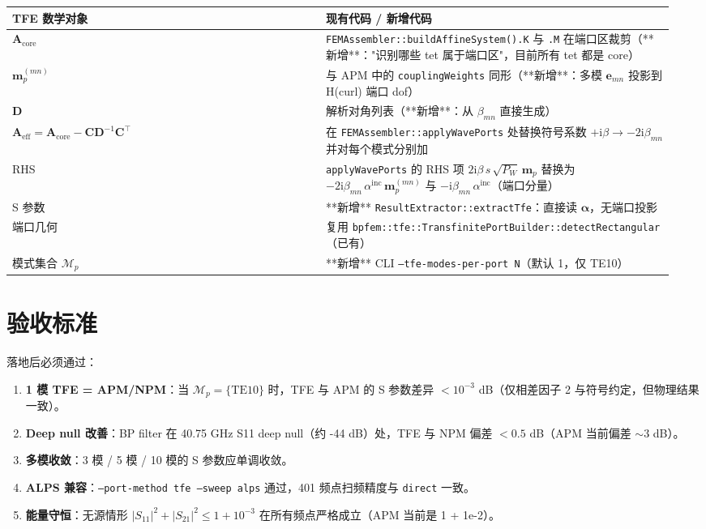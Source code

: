 \documentclass[11pt,a4paper]{ctexart}
\newcommand{\im}{\mathrm{i}}
\begin{document}
\begin{table}[h]
\centering
\begin{tabular}{p{0.45\linewidth}p{0.5\linewidth}}
\toprule
TFE 数学对象 & 现有代码 / 新增代码 \\
\midrule
$\bm A_{\text{core}}$ & \texttt{FEMAssembler::buildAffineSystem().K} 与 \texttt{.M} 在端口区裁剪（**新增**："识别哪些 tet 属于端口区"，目前所有 tet 都是 core）\\
$\bm m_p^{(mn)}$ & 与 APM 中的 \texttt{couplingWeights} 同形（**新增**：多模 $\bm e_{mn}$ 投影到 H(curl) 端口 dof）\\
$\bm D$ & 解析对角列表（**新增**：从 $\beta_{mn}$ 直接生成）\\
$\bm A_{\text{eff}} = \bm A_{\text{core}} - \bm C \bm D^{-1} \bm C^{\!\top}$ & 在 \texttt{FEMAssembler::applyWavePorts} 处替换符号系数 $+\im\beta \to -2\im\beta_{mn}$ 并对每个模式分别加 \\
RHS & \texttt{applyWavePorts} 的 RHS 项 $2\im\beta\,s\,\sqrt{P_W}\,\bm m_p$ 替换为 $-2\im\beta_{mn}\,\alpha^{\text{inc}}\,\bm m_p^{(mn)}$ 与 $-\im\beta_{mn}\,\alpha^{\text{inc}}$（端口分量）\\
S 参数 & **新增** \texttt{ResultExtractor::extractTfe}：直接读 $\bm \alpha$，无端口投影 \\
端口几何 & 复用 \texttt{bpfem::tfe::TransfinitePortBuilder::detectRectangular}（已有）\\
模式集合 $\mathcal M_p$ & **新增** CLI \texttt{--tfe-modes-per-port N}（默认 1，仅 TE10）\\
\bottomrule
\end{tabular}
\end{table}

\section{验收标准}

落地后必须通过：

\begin{enumerate}
\item \textbf{1 模 TFE = APM/NPM}：当 $\mathcal M_p = \{\text{TE10}\}$ 时，TFE 与 APM 的 S 参数差异 $< 10^{-3}$ dB（仅相差因子 2 与符号约定，但物理结果一致）。
\item \textbf{Deep null 改善}：BP filter 在 40.75 GHz S11 deep null（约 -44 dB）处，TFE 与 NPM 偏差 $< 0.5$ dB（APM 当前偏差 $\sim 3$ dB）。
\item \textbf{多模收敛}：3 模 / 5 模 / 10 模的 S 参数应单调收敛。
\item \textbf{ALPS 兼容}：\texttt{--port-method tfe --sweep alps} 通过，401 频点扫频精度与 \texttt{direct} 一致。
\item \textbf{能量守恒}：无源情形 $|S_{11}|^2 + |S_{21}|^2 \le 1 + 10^{-3}$ 在所有频点严格成立（APM 当前是 1 + 1e-2）。
\end{enumerate}
\end{document}
